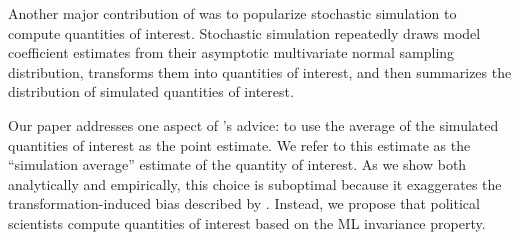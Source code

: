 \documentclass[11pt]{article}
\begin{document}



Another major contribution of \cite{KingTomzWittenberg2000} was to popularize stochastic simulation to compute quantities of interest. Stochastic simulation repeatedly draws model coefficient estimates from their asymptotic multivariate normal sampling distribution, transforms them into quantities of interest, and then summarizes the distribution of simulated quantities of interest.




Our paper addresses one aspect of \cite{KingTomzWittenberg2000}'s advice: to use the average of the simulated quantities of interest as the point estimate. We refer to this estimate as the ``simulation average'' estimate of the quantity of interest. As we show both analytically and empirically, this choice is suboptimal because it exaggerates the transformation-induced bias described by \cite{Rainey2017}. Instead, we propose that political scientists compute quantities of interest based on the ML invariance property.
\end{document}

